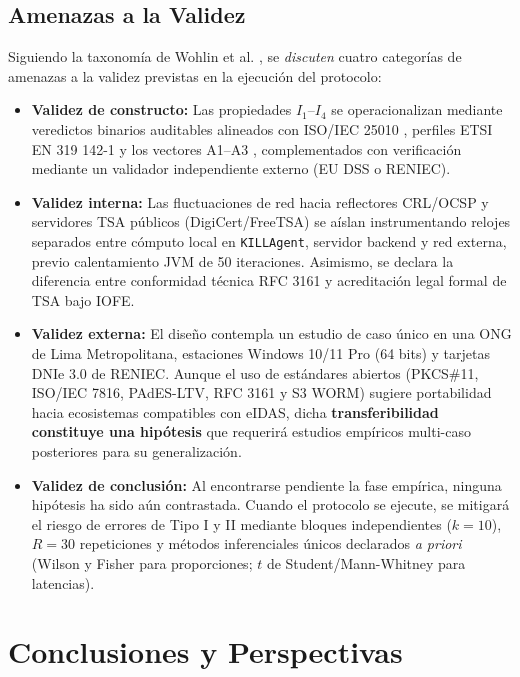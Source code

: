 \documentclass[runningheads,twocolumn]{llncs}
\begin{document}
\subsection{Amenazas a la Validez}\label{sec:threats}
Siguiendo la taxonomía de Wohlin et al. \cite{wohlin2012}, se \emph{discuten} cuatro categorías de amenazas a la validez previstas en la ejecución del protocolo:
\begin{itemize}
    \item \textbf{Validez de constructo:} Las propiedades $I_1$--$I_4$ se operacionalizan mediante veredictos binarios auditables alineados con ISO/IEC 25010 \cite{iso25010}, perfiles ETSI EN 319 142-1 \cite{etsi2024} y los vectores A1--A3 \cite{heher2027}, complementados con verificación mediante un validador independiente externo (EU DSS o RENIEC).
    \item \textbf{Validez interna:} Las fluctuaciones de red hacia reflectores CRL/OCSP y servidores TSA públicos (DigiCert/FreeTSA) se aíslan instrumentando relojes separados entre cómputo local en \texttt{KILLAgent}, servidor backend y red externa, previo calentamiento JVM de 50 iteraciones. Asimismo, se declara la diferencia entre conformidad técnica RFC 3161 y acreditación legal formal de TSA bajo IOFE.
    \item \textbf{Validez externa:} El diseño contempla un estudio de caso único en una ONG de Lima Metropolitana, estaciones Windows 10/11 Pro (64 bits) y tarjetas DNIe 3.0 de RENIEC. Aunque el uso de estándares abiertos (PKCS\#11, ISO/IEC 7816, PAdES-LTV, RFC 3161 y S3 WORM) sugiere portabilidad hacia ecosistemas compatibles con eIDAS, dicha \textbf{transferibilidad constituye una hipótesis} que requerirá estudios empíricos multi-caso posteriores para su generalización.
    \item \textbf{Validez de conclusión:} Al encontrarse pendiente la fase empírica, ninguna hipótesis ha sido aún contrastada. Cuando el protocolo se ejecute, se mitigará el riesgo de errores de Tipo I y II mediante bloques independientes ($k = 10$), $R = 30$ repeticiones y métodos inferenciales únicos declarados \textit{a priori} (Wilson y Fisher para proporciones; $t$ de Student/Mann-Whitney para latencias).
\end{itemize}

\section{Conclusiones y Perspectivas}\label{sec:conclusions}
\end{document}
